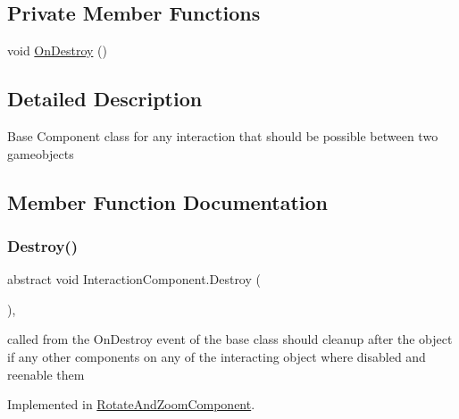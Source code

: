 \subsection*{Private Member Functions}
\begin{DoxyCompactItemize}
\item 
void \mbox{\hyperlink{class_interaction_component_a3add77b0cb9df6b962ea2c66d317fa46}{On\+Destroy}} ()
\end{DoxyCompactItemize}


\subsection{Detailed Description}
Base Component class for any interaction that should be possible between two gameobjects 



\subsection{Member Function Documentation}
\mbox{\label{class_interaction_component_aa28f5c9f92b342c3d52f8b0b251fb4fa}} 
\subsubsection{\texorpdfstring{Destroy()}{Destroy()}}
{\footnotesize\ttfamily abstract void Interaction\+Component.\+Destroy (\begin{DoxyParamCaption}{ }\end{DoxyParamCaption})\hspace{0.3cm}{\ttfamily [protected]}, {}}



called from the On\+Destroy event of the base class should cleanup after the object if any other components on any of the interacting object where disabled and reenable them 



Implemented in \mbox{\hyperlink{class_rotate_and_zoom_component_aa116a1acdc75d587605b6fa043474982}{Rotate\+And\+Zoom\+Component}}.

